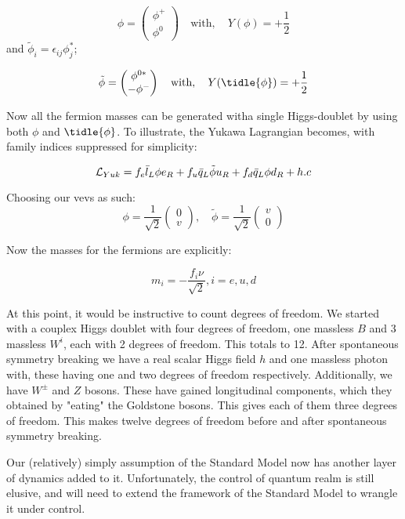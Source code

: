 \begin{equation*}
    \phi = \begin{pmatrix}
    \phi^+ \\
    \phi^0
    \end{pmatrix}
    \quad \textrm{with}, \quad Y(\phi) = +\frac{1}{2}
\end{equation*}
and $\tilde{\phi}_i = \epsilon_{ij} \phi_j^*$;

\begin{equation*}
    \tilde{\phi} = \begin{pmatrix}
    \phi^{0*} \\
    -\phi^-
    \end{pmatrix}
    \quad \textrm{with}, \quad Y(\tidle{\phi}) = +\frac{1}{2}
\end{equation*}

Now all the fermion masses can be generated witha single Higgs-doublet by using both $\phi$ and $\tidle{\phi}$. To illustrate, the Yukawa Lagrangian becomes, with family indices suppressed for simplicity:

\begin{equation*}
    \mathcal{L}_{Yuk} = f_e\bar{l}_L\phi e_R + f_u\bar{q}_L\tilde{\phi}u_R + f_d\bar{q}_L\phi d_R + h.c
\end{equation*}

Choosing our vevs as such:
\begin{equation*}
    \phi = \frac{1}{\sqrt{2}} \begin{pmatrix}
    0 \\
    v 
    \end{pmatrix},
    \quad 
    \tilde{\phi} = \frac{1}{\sqrt{2}}\begin{pmatrix}
    v \\
    0 
    \end{pmatrix}
\end{equation*}

Now the masses for the fermions are explicitly:

\begin{equation*}
    m_i = -\frac{f_i \nu}{\sqrt{2}}, i = e, u , d
\end{equation*}

At this point, it would be instructive to count degrees of freedom. We started with a couplex Higgs doublet with four degrees of freedom, one massless $B$ and 3 massless $W^i$, each with 2 degrees of freedom. This totals to 12. After spontaneous symmetry breaking we have a real scalar Higgs field $h$ and one massless photon with, these having one and two degrees of freedom respectively. Additionally, we have $W^{\pm}$ and $Z$ bosons. These have gained longitudinal components, which they obtained by "eating" the Goldstone bosons. This gives each of them three degrees of freedom. This makes twelve degrees of freedom before and after spontaneous symmetry breaking. 

 Our (relatively) simply assumption of the Standard Model now has another layer of dynamics added to it. Unfortunately, the control of quantum realm is still elusive, and will need to extend the framework of the Standard Model to wrangle it under control. 

